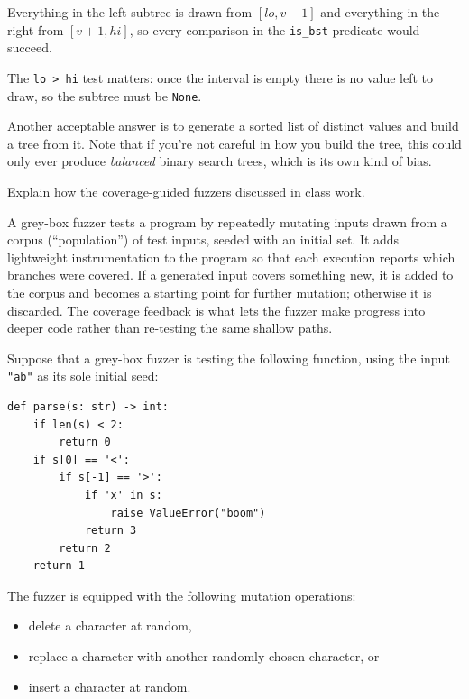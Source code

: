 \documentclass[addpoints, answers]{exam}
\newcommand{\Code}[1]{\texttt{#1}}
\begin{document}
\begin{questions}
\begin{parts}
\begin{solution}
    Everything in the left subtree is drawn from $[lo, v-1]$ and
    everything in the right from $[v+1, hi]$, so every comparison in
    the \Code{is_bst} predicate would succeed.

    The \Code{lo > hi} test matters: once the interval is empty there is
    no value left to draw, so the subtree must be \Code{None}.

    Another acceptable answer is to generate a sorted list of distinct
    values and build a tree from it. Note that if you're not careful
    in how you build the tree, this could only ever produce
    \emph{balanced} binary search trees, which is its own kind of
    bias.
  \end{solution}
\end{parts}
\newpage

\question[5] Explain how the coverage-guided fuzzers discussed in class
  work.
  \begin{solution} %
    A grey-box fuzzer tests a program by repeatedly mutating inputs
    drawn from a corpus (``population'') of test inputs, seeded with an
    initial set. It adds lightweight instrumentation to the program so
    that each execution reports which branches were covered. If a
    generated input covers something new, it is added to the corpus and
    becomes a starting point for further mutation; otherwise it is
    discarded. The coverage feedback is what lets the fuzzer make
    progress into deeper code rather than re-testing the same shallow
    paths.
  \end{solution}

\question Suppose that a grey-box fuzzer is testing the following
  function, using the input \Code{"ab"} as its sole initial seed:

\begin{verbatim}
def parse(s: str) -> int:
    if len(s) < 2:
        return 0
    if s[0] == '<':
        if s[-1] == '>':
            if 'x' in s:
                raise ValueError("boom")
            return 3
        return 2
    return 1
\end{verbatim}

  The fuzzer is equipped with the following mutation operations:
  \begin{itemize}
  \item delete a character at random,
  \item replace a character with another randomly chosen character, or
  \item insert a character at random.
  \end{itemize}


\end{questions}
\end{document}
